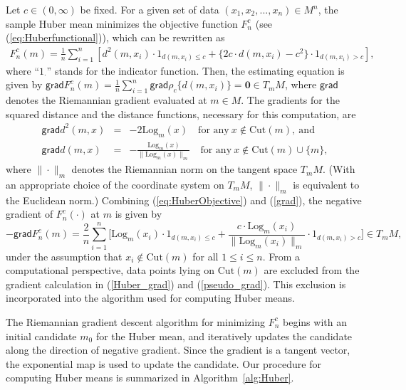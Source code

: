 \documentclass[preprint]{imsart}
\theoremstyle{plain}
\theoremstyle{remark}
\begin{document}
Let $c \in (0,\infty)$ be fixed. 
For a given set of data $(x_{1}, x_{2}, ..., x_{n}) \in M^{n}$, the sample Huber mean minimizes the objective function $F_n^c$ (see (\ref{eq:Huberfunctional})), which can be rewritten as
\begin{align}
    \label{eq:HuberObjective}
    F^{c}_{n}(m) = \frac{1}{n}\sum_{i=1}^{n}[d^2(m, x_i)\cdot 1_{d(m, x_i) \le c}+ \{2c \cdot d(m, x_i)-c^2\}\cdot 1_{d(m, x_i) > c}],
\end{align}
where ``$1_{\cdot}$'' stands for the indicator function. Then, the estimating equation is given by $\textsf{grad}F^{c}_{n}(m) = \frac{1}{n}\sum_{i=1}^{n} \textsf{grad}\rho_{c}\{d(m, x_{i})\} = \mathbf{0} \in T_{m} M$, where $\textsf{grad}$ denotes the Riemannian gradient evaluated at $m \in M$. %
The gradients for the squared distance and the distance functions, necessary for this computation, are 
\begin{eqnarray}\label{grad}
\textsf{grad}d^2(m, x) &=& -2 \mbox{Log}_{m}(x) \quad \mbox{for any} ~ x \notin  \mbox{Cut}(m), ~ \mbox{and} \nonumber \\
\textsf{grad}d(m, x) &=& -\frac{\mbox{Log}_{m}(x)}{\|\mbox{Log}_{m}(x)\|_{m}} \quad \mbox{for any} ~ x \notin \mbox{Cut}(m) \cup \{m\},
\end{eqnarray}
where $\| \cdot \|_{m}$ denotes the Riemannian norm on the tangent space $T_mM$. (With an appropriate choice of the coordinate system on $T_mM$, $\| \cdot \|_{m}$ is equivalent to the Euclidean norm.)
Combining (\ref{eq:HuberObjective}) and (\ref{grad}), the negative gradient of $F^{c}_{n}(\cdot)$ at $m$ is given by 
\begin{equation}\label{Huber_grad}
-\textsf{grad}F^{c}_{n}(m) = \frac{2}{n}\sum_{i=1}^n \big[\mbox{Log}_{m}(x_i) \cdot 1_{d(m, x_i)\le c} + \frac{c \cdot \mbox{Log}_{m}(x_i)}{\| \mbox{Log}_{m}(x_i)\|_{m}} \cdot 1_{d(m, x_i) > c}\big] \in T_{m}M,
\end{equation}
under the assumption that $x_i \notin \mbox{Cut}(m)$ for all $1\le i\le n$. 
From a computational perspective, data points lying on $\mbox{Cut}(m)$ are excluded from the gradient calculation in  (\ref{Huber_grad}) and (\ref{pseudo_grad}). This exclusion is incorporated into the algorithm used for computing Huber means. 

The Riemannian gradient descent algorithm for minimizing $F_n^c$ begins with an initial candidate $m_0$ for the Huber mean, and iteratively updates the candidate along the direction of negative gradient. Since the gradient is a tangent vector, the exponential map is used to update the candidate. Our procedure for computing Huber means is summarized in Algorithm~\ref{alg:Huber}. 
\end{document}
